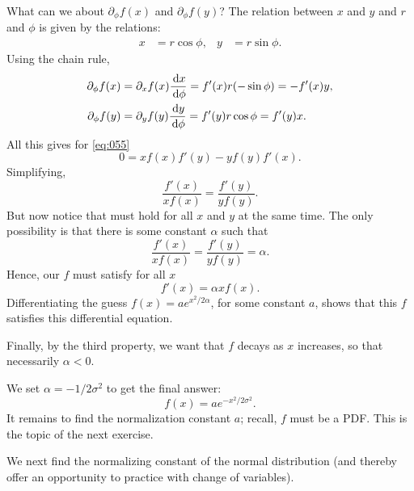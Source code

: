 \documentclass[lectures-questions]{subfiles}
\begin{document}
\begin{exercise}
\begin{solution}
What can we about $\partial_{\phi} f(x)$ and $\partial_{\phi}f(y)$?
The relation between $x$ and $y$ and $r$ and $\phi$ is given by the relations:
\begin{align}
\label{eq:056}
x &= r \cos \phi, & y&=r\sin \phi.
\end{align}
Using the chain rule,
\begin{align}
  \label{eq:057}
  \partial_{\phi} f(x) &= \partial_{x} f(x) \frac{\,\textrm{d}x}{\,\textrm{d}\phi} = f'(x) r (-\sin \phi) = - f'(x) y, \\
  \partial_{\phi} f(y) &= \partial_{y} f(y) \frac{\,\textrm{d}y}{\,\textrm{d}\phi} = f'(y) r \cos \phi =  f'(y) x.
\end{align}
All this gives for \cref{eq:055}
\begin{equation}
\label{eq:058}
0 = x f(x) f'(y) - y f(y)f'(x).
\end{equation}
Simplifying,
\begin{equation}
  \label{eq:059}
   \frac{f'(x)}{x f(x)} = \frac{f'(y)}{ y f(y)}.
\end{equation}
But now notice that must hold for all $x$ and $y$ at the same time. The only possibility is that there is some constant $\alpha$ such that
\begin{equation}
\label{eq:0510}
   \frac{f'(x)}{x f(x)} =  \frac{f'(y)}{y f(y)} = \alpha.
\end{equation}
Hence, our $f$ must satisfy for all $x$
\begin{equation}
\label{eq:0511}
f'(x) = \alpha x f(x).
\end{equation}
Differentiating the guess $f(x) = a e^{ x^2/{2 \alpha}}$, for some constant $a$, shows that this $f$ satisfies this differential equation.

Finally, by the third property, we want that $f$ decays as $x$ increases, so that necessarily $\alpha<0$.


We set $\alpha = -1/2\sigma^{2}$ to get the final answer:
\begin{equation}
  \label{eq:0512}
  f(x) = a e^{-x^{2}/2 \sigma^{2}}.
\end{equation}
It remains to find the normalization constant $a$; recall, $f$ must be a PDF. This is the topic of the next exercise.
\end{solution}
\end{exercise}

We next find the normalizing constant of the normal distribution (and thereby offer an opportunity to practice with change of variables).
\end{document}
